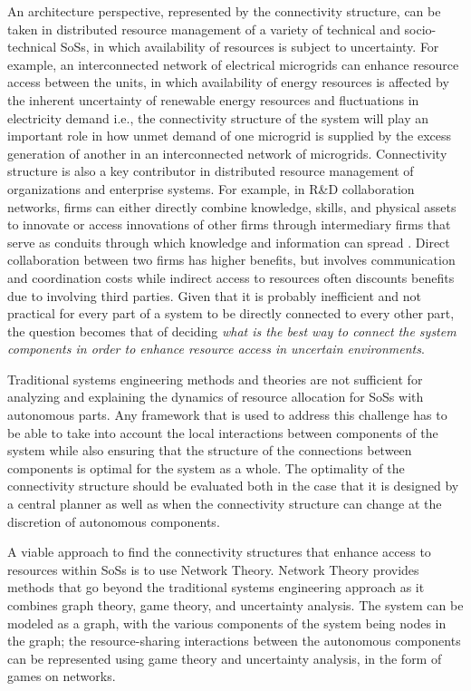 \documentclass[journal,onecolumn]{IEEEtran}
\theoremstyle{plain}
\begin{document}
An architecture perspective, represented by the connectivity structure, can be taken in distributed resource management of a variety of technical and socio-technical SoSs, in which availability of resources is subject to uncertainty. For example, an interconnected network of electrical microgrids can enhance resource access between the units, in which availability of energy resources is affected by the inherent uncertainty of renewable energy resources and fluctuations in electricity demand \citep{katiraei2005micro,saad2011coalitional} i.e., the connectivity structure of the system will play an important role in how unmet demand of one microgrid is supplied by the excess generation of another in an interconnected network of microgrids. Connectivity structure is also a key contributor in distributed resource management of organizations and enterprise systems. For example, in R\&D collaboration networks, firms can either directly combine knowledge, skills, and physical assets to innovate or access innovations of other firms through intermediary firms that serve as conduits through which knowledge and information can spread \citep{konig2012efficiency}. Direct collaboration between two firms has higher benefits, but involves communication and coordination costs while indirect access to resources often discounts benefits due to involving third parties. Given that it is probably inefficient and not practical for every part of a system to be directly connected to every other part, the question becomes that of deciding \textit{what is the best way to connect the system components in order to enhance resource access in uncertain environments}.

Traditional systems engineering methods and theories are not sufficient for analyzing and explaining the dynamics of resource allocation for SoSs with autonomous parts. Any framework that is used to address this challenge has to be able to take into account the local interactions between components of the system while also ensuring that the structure of the connections between components is optimal for the system as a whole. The optimality of the connectivity structure should be evaluated both in the case that it is designed by a central planner as well as when the connectivity structure can change at the discretion of autonomous components.

A viable approach to find the connectivity structures that enhance access to resources within SoSs is to use Network Theory. Network Theory provides methods that go beyond the traditional systems engineering approach as it combines graph theory, game theory, and uncertainty analysis. The system can be modeled as a graph, with the various components of the system being nodes in the graph; the resource-sharing interactions between the autonomous components can be represented using game theory and uncertainty analysis, in the form of games on networks. 
\end{document}
